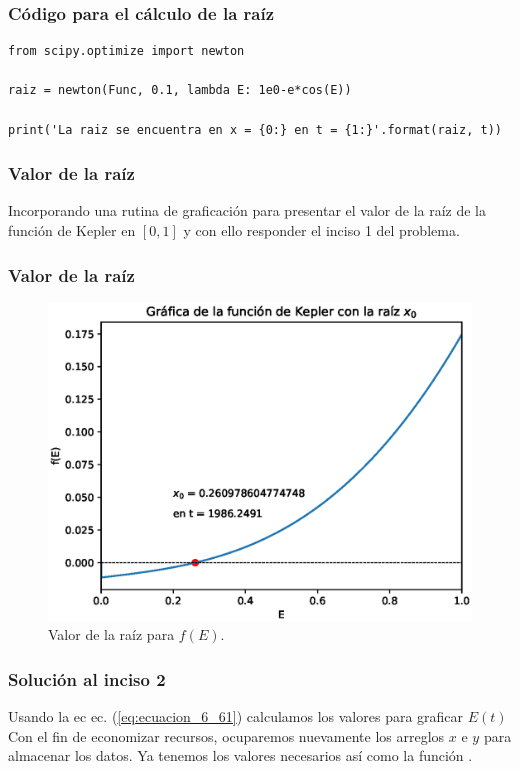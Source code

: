 \begin{frame}
\frametitle{Código para el cálculo de la raíz}
\begin{lstlisting}[caption=Cálculo de la raíz usando la función \texttt{newton}, style=codigopython]
from scipy.optimize import newton

raiz = newton(Func, 0.1, lambda E: 1e0-e*cos(E))

print('La raiz se encuentra en x = {0:} en t = {1:}'.format(raiz, t))
\end{lstlisting}
\end{frame}
\begin{frame}
\frametitle{Valor de la raíz}
Incorporando una rutina de graficación para presentar el valor de la raíz de la función de Kepler en $[0,1]
$ y con ello responder el inciso 1 del problema.
\end{frame}
\begin{frame}
\frametitle{Valor de la raíz}
\begin{figure}[h!]
    \centering
    \includegraphics[scale=0.5]{Imagenes/raices_scipy_aplicacion_02.eps}
    \caption{Valor de la raíz para $f(E)$.}
\end{figure}
\end{frame}
\begin{frame}
\frametitle{Solución al inciso 2}
Usando la ec ec. (\ref{eq:ecuacion_6_61}) calculamos los valores para graficar $E(t)$
\\
\bigskip
Con el fin de economizar recursos, ocuparemos nuevamente los arreglos $x$ e $y$ para almacenar los datos. Ya tenemos los valores necesarios así como la función .
\end{frame}
